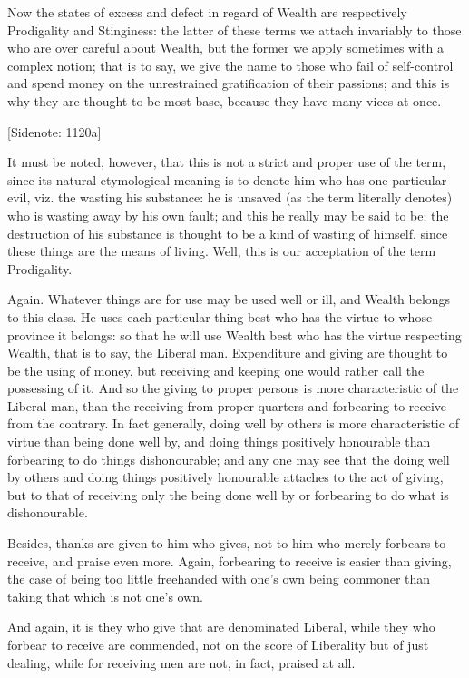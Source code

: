 Now the states of excess and defect in regard of Wealth are respectively
Prodigality and Stinginess: the latter of these terms we attach
invariably to those who are over careful about Wealth, but the former we
apply sometimes with a complex notion; that is to say, we give the name
to those who fail of self-control and spend money on the unrestrained
gratification of their passions; and this is why they are thought to be
most base, because they have many vices at once.

[Sidenote: 1120a]

It must be noted, however, that this is not a strict and proper use of
the term, since its natural etymological meaning is to denote him who
has one particular evil, viz. the wasting his substance: he is unsaved
(as the term literally denotes) who is wasting away by his own fault;
and this he really may be said to be; the destruction of his substance
is thought to be a kind of wasting of himself, since these things
are the means of living. Well, this is our acceptation of the term
Prodigality.

Again. Whatever things are for use may be used well or ill, and Wealth
belongs to this class. He uses each particular thing best who has the
virtue to whose province it belongs: so that he will use Wealth best
who has the virtue respecting Wealth, that is to say, the Liberal
man. Expenditure and giving are thought to be the using of money, but
receiving and keeping one would rather call the possessing of it. And so
the giving to proper persons is more characteristic of the Liberal man,
than the receiving from proper quarters and forbearing to receive
from the contrary. In fact generally, doing well by others is more
characteristic of virtue than being done well by, and doing things
positively honourable than forbearing to do things dishonourable;
and any one may see that the doing well by others and doing things
positively honourable attaches to the act of giving, but to that of
receiving only the being done well by or forbearing to do what is
dishonourable.

Besides, thanks are given to him who gives, not to him who merely
forbears to receive, and praise even more. Again, forbearing to receive
is easier than giving, the case of being too little freehanded with
one's own being commoner than taking that which is not one's own.

And again, it is they who give that are denominated Liberal, while they
who forbear to receive are commended, not on the score of Liberality but
of just dealing, while for receiving men are not, in fact, praised at
all.

